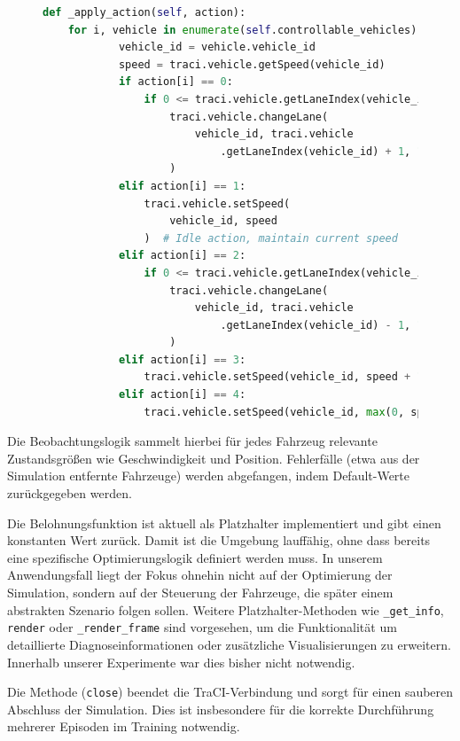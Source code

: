 \begin{figure}[ht]
\begin{lstlisting}[language=Python, caption=apply\_action Implementierung, label={lst:applyAction}, basicstyle=\ttfamily\small]
def _apply_action(self, action):
    for i, vehicle in enumerate(self.controllable_vehicles):
            vehicle_id = vehicle.vehicle_id
            speed = traci.vehicle.getSpeed(vehicle_id)
            if action[i] == 0:
                if 0 <= traci.vehicle.getLaneIndex(vehicle_id) + 1 < 3:
                    traci.vehicle.changeLane(
                        vehicle_id, traci.vehicle
                            .getLaneIndex(vehicle_id) + 1, 1
                    )
            elif action[i] == 1:
                traci.vehicle.setSpeed(
                    vehicle_id, speed
                )  # Idle action, maintain current speed
            elif action[i] == 2:
                if 0 <= traci.vehicle.getLaneIndex(vehicle_id) - 1 < 3:
                    traci.vehicle.changeLane(
                        vehicle_id, traci.vehicle
                            .getLaneIndex(vehicle_id) - 1, 1
                    )
            elif action[i] == 3:
                traci.vehicle.setSpeed(vehicle_id, speed + 1)
            elif action[i] == 4:
                traci.vehicle.setSpeed(vehicle_id, max(0, speed - 1))
\end{lstlisting}
\end{figure}
Die Beobachtungslogik sammelt hierbei für jedes Fahrzeug relevante Zustandsgrößen wie Geschwindigkeit und Position. Fehlerfälle (etwa aus der Simulation entfernte Fahrzeuge) werden abgefangen, indem Default-Werte zurückgegeben werden.

Die Belohnungsfunktion ist aktuell als Platzhalter implementiert und gibt einen konstanten Wert zurück. Damit ist die Umgebung lauffähig, ohne dass bereits eine spezifische Optimierungslogik definiert werden muss. In unserem Anwendungsfall liegt der Fokus ohnehin nicht auf der Optimierung der Simulation, sondern auf der Steuerung der Fahrzeuge, die später einem abstrakten Szenario folgen sollen. Weitere Platzhalter-Methoden wie \texttt{\_get\_info}, \texttt{render} oder \texttt{\_render\_frame} sind vorgesehen, um die Funktionalität um detaillierte Diagnoseinformationen oder zusätzliche Visualisierungen zu erweitern. Innerhalb unserer Experimente war dies bisher nicht notwendig.

Die Methode (\texttt{close}) beendet die TraCI-Verbindung und sorgt für einen sauberen Abschluss der Simulation. Dies ist insbesondere für die korrekte Durchführung mehrerer Episoden im Training notwendig.

